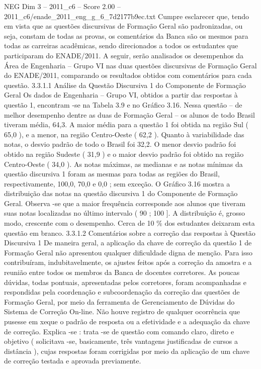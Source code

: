 \begin{textsample}{NEG Dim 3 – 2011\_c6 – Score 2.00 – 2011\_c6/enade\_2011\_eng\_g\_6\_7d2177b9ec.txt}
Cumpre esclarecer que, tendo em vista que as questões discursivas de Formação Geral são padronizadas, ou seja, constam de todas as provas, os comentários da Banca são os mesmos para todas as carreiras acadêmicas, sendo direcionados a todos os estudantes que participaram do ENADE/2011.
A seguir, serão analisados os desempenhos da Área de Engenharia – Grupo VI nas duas questões discursivas de Formação Geral do ENADE/2011, comparando os resultados obtidos com comentários para cada questão. 3.3.1.1 Análise da Questão Discursiva 1 do Componente de Formação Geral Os dados de Engenharia – Grupo VI, obtidos a partir das respostas à questão 1, encontram -se na Tabela 3.9 e no Gráfico 3.16.
Nessa questão – de melhor desempenho dentre as duas de Formação Geral – os alunos de todo Brasil tiveram média, 64,3.
A maior média para a questão 1 foi obtida na região Sul ( 65,0 ), e a menor, na região Centro-Oeste ( 62,2 ).
Quanto à variabilidade das notas, o desvio padrão de todo o Brasil foi 32,2.
O menor desvio padrão foi obtido na região Sudeste ( 31,9 ) e o maior desvio padrão foi obtido na região Centro-Oeste ( 34,0 ).
As notas máximas, as medianas e as notas mínimas da questão discursiva 1 foram as mesmas para todas as regiões do Brasil, respectivamente, 100,0, 70,0 e 0,0 ; sem exceção.
O Gráfico 3.16 mostra a distribuição das notas na questão discursiva 1 do Componente de Formação Geral.
Observa -se que a maior frequência corresponde aos alunos que tiveram suas notas localizadas no último intervalo ( 90 ; 100 ].
A distribuição é, grosso modo, crescente com o desempenho.
Cerca de 10 \% dos estudantes deixaram esta questão em branco. 3.3.1.2 Comentários sobre a correção das respostas à Questão Discursiva 1 De maneira geral, a aplicação da chave de correção da questão 1 de Formação Geral não apresentou qualquer dificuldade digna de menção.
Para isso contribuíram, indubitavelmente, os ajustes feitos após a correção da amostra e a reunião entre todos os membros da Banca de docentes corretores.
As poucas dúvidas, todas pontuais, apresentadas pelos corretores, foram acompanhadas e respondidas pela coordenação e subcoordenação da correção das questões de Formação Geral, por meio da ferramenta de Gerenciamento de Dúvidas do Sistema de Correção On-line.
Não houve registro de qualquer ocorrência que pusesse em xeque o padrão de resposta ou a efetividade e a adequação da chave de correção.
Explica -se : trata -se de questão com comando claro, direto e objetivo ( solicitava -se, basicamente, três vantagens justificadas de cursos a distância ), cujas respostas foram corrigidas por meio da aplicação de um chave de correção testada e aprovada previamente.

\end{textsample}
